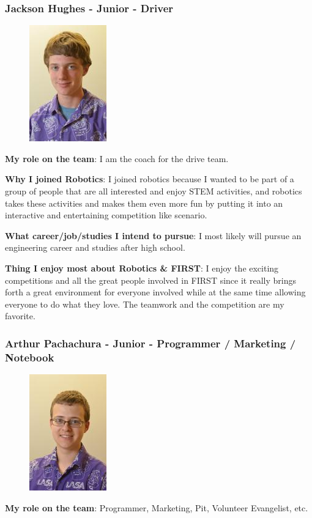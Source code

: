 \subsubsection{Jackson Hughes - Junior - Driver} 
\begin{figure}[H]
	\includegraphics[width=0.2\linewidth]{jackson}
\end{figure}
{\bf My role on the team}: I am the coach for the drive team.

{\bf Why I joined Robotics}: I joined robotics because I wanted to be part of a group of people that are all interested and enjoy STEM activities, and robotics takes these activities and makes them even more fun by putting it into an interactive and entertaining competition like scenario.

{\bf What career/job/studies I intend to pursue}: I most likely will pursue an engineering career and studies after high school. 

{\bf Thing I enjoy most about Robotics \& FIRST}: I enjoy the exciting competitions and all the great people involved in FIRST since it really brings forth a great environment for everyone involved while at the same time allowing everyone to do what they love.  The teamwork and the competition are my favorite.  

\subsubsection{Arthur Pachachura - Junior - Programmer /  Marketing / Notebook} 
\begin{figure}[H]
	\includegraphics[width=0.2\linewidth]{arthur}
\end{figure}
{\bf My role on the team}: Programmer, Marketing, Pit, Volunteer Evangelist, etc.

